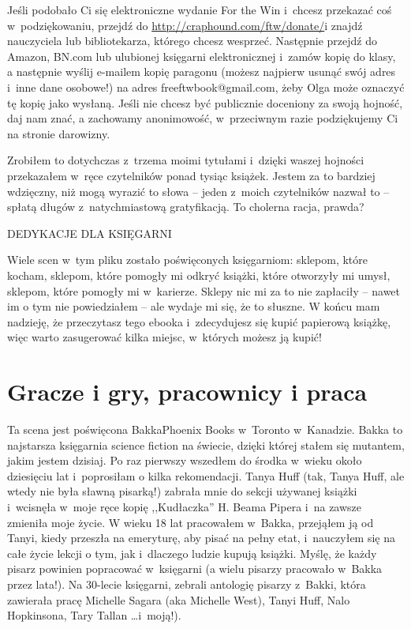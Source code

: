 \documentclass[oneside,polish,11pt,rmheadings]{mwbk}
\begin{document}
Jeśli podobało Ci się elektroniczne wydanie For the Win i~chcesz przekazać coś w~podziękowaniu, przejdź do \url{http://craphound.com/ftw/donate/}i znajdź nauczyciela lub bibliotekarza, którego chcesz wesprzeć. Następnie przejdź do Amazon, BN.com lub ulubionej księgarni elektronicznej i~zamów kopię do klasy, a następnie wyślij e-mailem kopię paragonu (możesz najpierw usunąć swój adres i~inne dane osobowe!) na adres freeftwbook@gmail.com, żeby Olga może oznaczyć tę kopię jako wysłaną. Jeśli nie chcesz być publicznie doceniony za swoją hojność, daj nam znać, a zachowamy anonimowość, w~przeciwnym razie podziękujemy Ci na stronie darowizny. 


Zrobiłem to dotychczas z~trzema moimi tytułami i~dzięki waszej hojności przekazałem w~ręce czytelników ponad tysiąc książek. Jestem za to bardziej wdzięczny, niż mogą wyrazić to słowa -- jeden z~moich czytelników nazwał to -- spłatą długów z~natychmiastową gratyfikacją. To cholerna racja, prawda? 

\bigskip
\noindent  DEDYKACJE DLA KSIĘGARNI 


Wiele scen w~tym pliku zostało poświęconych księgarniom: sklepom, które kocham, sklepom, które pomogły mi odkryć książki, które otworzyły mi umysł, sklepom, które pomogły mi w~karierze. Sklepy nic mi za to nie zapłaciły -- nawet im o tym nie powiedziałem -- ale wydaje mi się, że to słuszne. W końcu mam nadzieję, że przeczytasz tego ebooka i~zdecydujesz się kupić papierową książkę, więc warto zasugerować kilka miejsc, w~których możesz ją kupić! 



\chapter{Gracze i gry, pracownicy i praca }

Ta scena jest poświęcona BakkaPhoenix Books w~Toronto w~Kanadzie. Bakka to najstarsza księgarnia science fiction na świecie, dzięki której stałem się mutantem, jakim jestem dzisiaj. Po raz pierwszy wszedłem do środka w~wieku około dziesięciu lat i~poprosiłam o kilka rekomendacji. Tanya Huff (tak, Tanya Huff, ale wtedy nie była sławną pisarką!) zabrała mnie do sekcji używanej książki i~wcisnęła w~moje ręce kopię ,,Kudłaczka'' H. Beama Pipera i~na zawsze zmieniła moje życie. W wieku 18 lat pracowałem w~Bakka, przejąłem ją od Tanyi, kiedy przeszła na emeryturę, aby pisać na pełny etat, i~nauczyłem się na całe życie lekcji o tym, jak i~dlaczego ludzie kupują książki. Myślę, że każdy pisarz powinien popracować w~księgarni (a wielu pisarzy pracowało w~Bakka przez lata!). Na 30-lecie księgarni, zebrali antologię pisarzy z~Bakki, która zawierała pracę Michelle Sagara (aka Michelle West), Tanyi Huff, Nalo Hopkinsona, Tary Tallan \ldots  i~moją!). 
\end{document}
